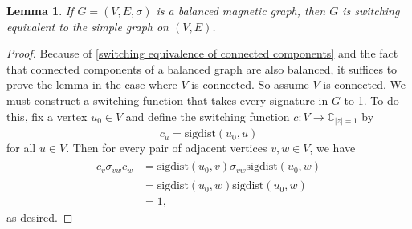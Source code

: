\documentclass[12pt]{article}
\newtheorem{lem}[thm]{Lemma}
\theoremstyle{definition}
\newcommand{\C}{\mathbb C}
\begin{document}
\begin{lem}\label{balanced implies switching equivalent to simple graph}
If $G=(V, E, \sigma)$ is a balanced magnetic graph, then $G$ is switching equivalent to the simple graph on $(V, E)$.
\end{lem}
\begin{proof}
Because of \cref{switching equivalence of connected components} and the fact that connected components of a balanced graph are also balanced, it suffices to prove the lemma in the case where $V$ is connected. So assume $V$ is connected. We must construct a switching function that takes every signature in $G$ to 1. To do this, fix a vertex $u_0 \in V$ and define the switching function $c: V \rightarrow \C_{|z|=1}$ by 
$$c_u = \overline{\text{sigdist} (u_0, u)}$$
for all $u \in V$. Then for every pair of adjacent vertices $v, w \in V$, we have
\begin{align*}
\overline{c_v} \sigma_{vw} c_w
&= \text{sigdist} (u_0, v) \sigma_{vw} \overline{\text{sigdist} (u_0, w)} \\
&= \text{sigdist} (u_0, w) \overline{\text{sigdist} (u_0, w)} \\
&= 1,
\end{align*}
as desired.
\end{proof}
\end{document}
